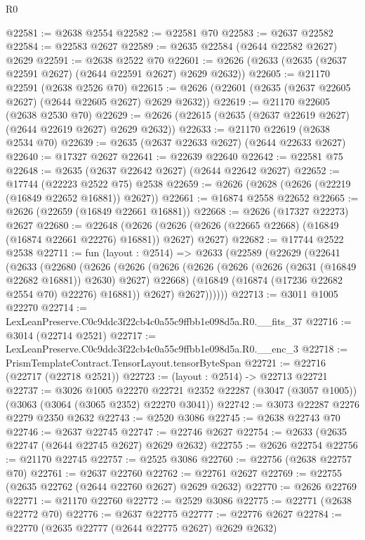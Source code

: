 \begin{lexlean}{R0}
\begin{coremodule}
@22581 := @2638 @2554
@22582 := @22581 @70
@22583 := @2637 @22582
@22584 := @22583 @2627
@22589 := @2635 @22584 (@2644 @22582 @2627) @2629
@22591 := @2638 @2522 @70
@22601 := @2626 (@2633 (@2635 (@2637 @22591 @2627) (@2644 @22591 @2627) @2629 @2632))
@22605 := @21170 @22591 (@2638 @2526 @70)
@22615 := @2626 (@22601 (@2635 (@2637 @22605 @2627) (@2644 @22605 @2627) @2629 @2632))
@22619 := @21170 @22605 (@2638 @2530 @70)
@22629 := @2626 (@22615 (@2635 (@2637 @22619 @2627) (@2644 @22619 @2627) @2629 @2632))
@22633 := @21170 @22619 (@2638 @2534 @70)
@22639 := @2635 (@2637 @22633 @2627) (@2644 @22633 @2627)
@22640 := @17327 @2627
@22641 := @22639 @22640
@22642 := @22581 @75
@22648 := @2635 (@2637 @22642 @2627) (@2644 @22642 @2627)
@22652 := @17744 (@22223 @2522 @75) @2538
@22659 := @2626 (@2628 (@2626 (@22219 (@16849 @22652 @16881)) @2627))
@22661 := @16874 @2558 @22652
@22665 := @2626 (@22659 (@16849 @22661 @16881))
@22668 := @2626 (@17327 @22273) @2627
@22680 := @22648
    (@2626 (@2626 (@2626 (@22665 @22668) (@16849 (@16874 @22661 @22276) @16881)) @2627) @2627)
@22682 := @17744 @2522 @2538
@22711 := fun (layout : @2514) =>
  @2633
    (@22589
      (@22629
        (@22641
          (@2633
            (@22680
              (@2626
                (@2626
                  (@2626
                    (@2626 (@2626 (@2626 (@2631 (@16849 @22682 @16881)) @2630) @2627) @22668)
                    (@16849 (@16874 (@17236 @22682 @2554 @70) @22276) @16881))
                  @2627)
                @2627))))))
@22713 := @3011 @1005 @22270
@22714 := LexLeanPreserve.C0c9ddc3f22cb4c0a55c9ffbb1e098d5a.R0.__fits_37
@22716 := @3014 (@22714 @2521)
@22717 := LexLeanPreserve.C0c9ddc3f22cb4c0a55c9ffbb1e098d5a.R0.__enc_3
@22718 := PrismTemplateContract.TensorLayout.tensorByteSpan
@22721 := @22716 (@22717 (@22718 @2521))
@22723 := (layout : @2514) -> @22713 @22721
@22737 := @3026
    @1005
    @22270
    @22721
    @2352
    @22287
    (@3047 (@3057 @1005))
    (@3063 (@3064 (@3065 @2352) @22270 @3041))
@22742 := @3073 @22287 @2276 @2279 @2350 @2632
@22743 := @2520 @3086
@22745 := @2638 @22743 @70
@22746 := @2637 @22745
@22747 := @22746 @2627
@22754 := @2633 (@2635 @22747 (@2644 @22745 @2627) @2629 @2632)
@22755 := @2626 @22754
@22756 := @21170 @22745
@22757 := @2525 @3086
@22760 := @22756 (@2638 @22757 @70)
@22761 := @2637 @22760
@22762 := @22761 @2627
@22769 := @22755 (@2635 @22762 (@2644 @22760 @2627) @2629 @2632)
@22770 := @2626 @22769
@22771 := @21170 @22760
@22772 := @2529 @3086
@22775 := @22771 (@2638 @22772 @70)
@22776 := @2637 @22775
@22777 := @22776 @2627
@22784 := @22770 (@2635 @22777 (@2644 @22775 @2627) @2629 @2632)

\end{coremodule}
\end{lexlean}

